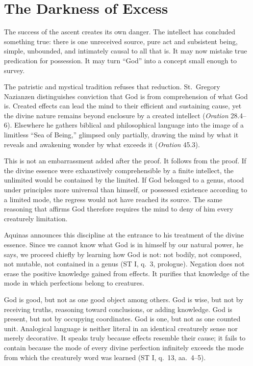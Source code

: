 \section{The Darkness of Excess}

The success of the ascent creates its own danger. The intellect has concluded something true: there is one unreceived source, pure act and subsistent being, simple, unbounded, and intimately causal to all that is. It may now mistake true predication for possession. It may turn ``God'' into a concept small enough to survey.

The patristic and mystical tradition refuses that reduction. St.~Gregory Nazianzen distinguishes conviction that God is from comprehension of what God is. Created effects can lead the mind to their efficient and sustaining cause, yet the divine nature remains beyond enclosure by a created intellect (\emph{Oration} 28.4--6). Elsewhere he gathers biblical and philosophical language into the image of a limitless ``Sea of Being,'' glimpsed only partially, drawing the mind by what it reveals and awakening wonder by what exceeds it (\emph{Oration} 45.3).

This is not an embarrassment added after the proof. It follows from the proof. If the divine essence were exhaustively comprehensible by a finite intellect, the unlimited would be contained by the limited. If God belonged to a genus, stood under principles more universal than himself, or possessed existence according to a limited mode, the regress would not have reached its source. The same reasoning that affirms God therefore requires the mind to deny of him every creaturely limitation.

Aquinas announces this discipline at the entrance to his treatment of the divine essence. Since we cannot know what God is in himself by our natural power, he says, we proceed chiefly by learning how God is not: not bodily, not composed, not mutable, not contained in a genus (ST I, q.~3, prologue). Negation does not erase the positive knowledge gained from effects. It purifies that knowledge of the mode in which perfections belong to creatures.

God is good, but not as one good object among others. God is wise, but not by receiving truths, reasoning toward conclusions, or adding knowledge. God is present, but not by occupying coordinates. God is one, but not as one counted unit. Analogical language is neither literal in an identical creaturely sense nor merely decorative. It speaks truly because effects resemble their cause; it fails to contain because the mode of every divine perfection infinitely exceeds the mode from which the creaturely word was learned (ST I, q.~13, aa.~4--5).

